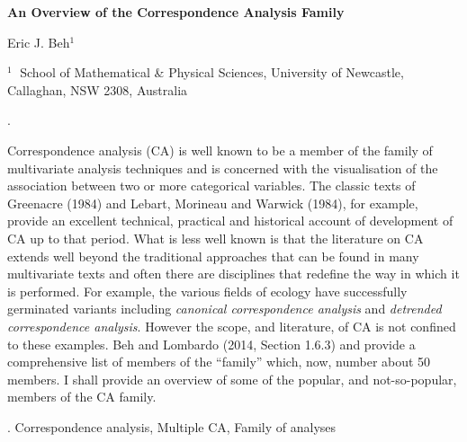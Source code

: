 \documentclass[12pt]{article}
\begin{document}
\begin{flushleft}


{\LARGE\bf An Overview of the Correspondence Analysis Family}


\vspace{1.0cm}

Eric J. Beh$^1$

\begin{description}

\item $^1 \;$ School of Mathematical \& Physical Sciences, University of Newcastle, Callaghan, NSW 2308, Australia

\end{description}

\end{flushleft}


\vspace{0.75cm}

. 

Correspondence analysis (CA) is well known to be a member of the family of multivariate analysis techniques and is concerned with the visualisation of the association between two or more categorical variables. The classic texts of Greenacre (1984) and Lebart, Morineau and Warwick (1984), for example, provide an excellent technical, practical and historical account of development of CA up to that period. What is less well known is that the literature on CA extends well beyond the traditional approaches that can be found in many multivariate texts and often there are disciplines that redefine the way in which it is performed. For example, the various fields of ecology have successfully germinated variants including {\it canonical correspondence analysis} and {\it detrended correspondence analysis}. However the scope, and literature, of CA is not confined to these examples. Beh and Lombardo (2014, Section 1.6.3) and provide a comprehensive list of members of the ``family'' which, now, number about 50 members. I shall provide an overview of some of the popular, and not-so-popular, members of the CA family.

\vskip 2mm

.
Correspondence analysis, Multiple CA, Family of analyses
\end{document}

